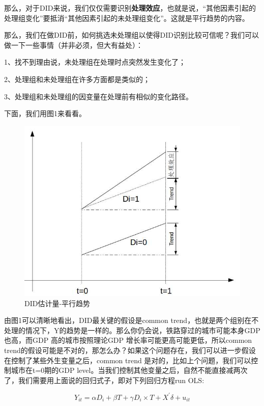 \documentclass[cn,10pt,math=newtx,citestyle=gb7714-2015,bibstyle=gb7714-2015]{elegantbook}
\begin{document}
	那么，对于DID来说，我们仅仅需要识别\textbf{处理效应}，也就是说，“其他因素引起的处理组变化”要抵消“其他因素引起的未处理组变化”。这就是平行趋势的内容。
	
	那么，我们在做DID前，如何挑选未处理组以使得DID识别比较可信呢？我们可以做一下一些事情（并非必须，但大有益处）：
	
	1、找不到理由说，未处理组在处理时点突然发生变化了；
	
	2、处理组和未处理组在许多方面都是类似的；
	
	3、处理组和未处理组的因变量在处理前有相似的变化路径。
	
	
	下面，我们用图1来看看。
	\begin{figure}[htbp]
		\centering
		\includegraphics[width=1\textwidth]{commontrend.jpg}
		\caption{DID估计量-平行趋势}\label{fig:digit}
	\end{figure}
	
	由图1可以清晰地看出，DID最关键的假设是common trend，也就是两个组别在不处理的情况下，Y的趋势是一样的。那么你仍会说，铁路穿过的城市可能本身GDP也高，而GDP 高的城市按照理论GDP 增长率可能更高可能更低，所以common trend的假设可能是不对的，那怎么办？如果这个问题存在，我们可以进一步假设在控制了某些外生变量之后，common trend 是对的，比如上个问题，我们可以控制城市在t=0期的GDP level。当我们控制其他变量之后，自然不能直接减两次了，我们需要用上面说的回归式子，即对下列回归方程run OLS:
	
	\begin{equation}
		Y_{it}=\alpha{D}_i+\beta{T}+\gamma{D_i\times{T}}+X^{'}\delta+u_{it}
	\end{equation}
	
\end{document}
